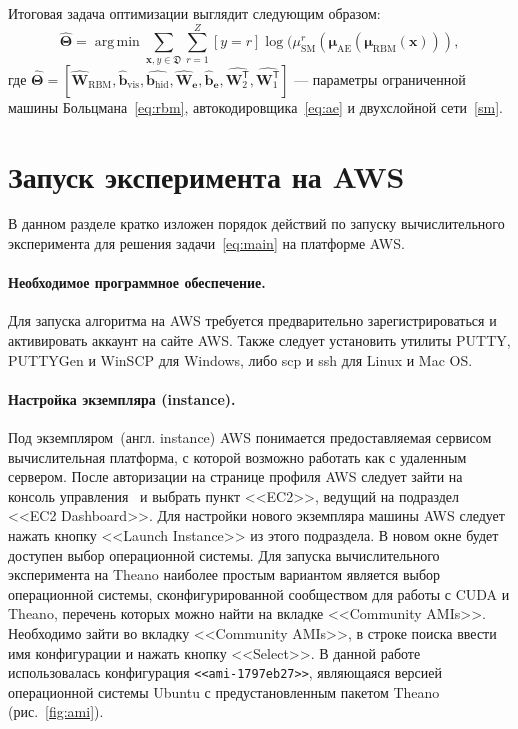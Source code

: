 \documentclass[12pt,notitlepage]{article}
\DeclareMathOperator*{\argmin}{arg\,min}
\begin{document}
Итоговая задача оптимизации выглядит следующим образом:
\[
 \hat{\mathbf{\mathbf{\Theta}}} = \argmin\sum_{\mathbf{x},y \in \mathfrak{D}}\sum_{r = 1}^Z[y = r]\log({\mu}^r_\text{SM}(\mathbf{\boldsymbol{\mu}}_\text{AE}(\mathbf{\boldsymbol{\mu}}_\text{RBM}(\mathbf{x}))),
\]
где $\hat{\mathbf{\mathbf{\Theta}}} = [\hat{\mathbf{W}}_\text{RBM},\hat{\mathbf{b}}_\text{vis},\hat{\mathbf{b}_\text{hid}}, \hat{\mathbf{W}}_\textbf{e}, \hat{\mathbf{b}}_\textbf{e}, \hat{\mathbf{W}^\mathsf{T}_2}, \hat{\mathbf{W}^\mathsf{T}_1}]$ --- параметры ограниченной машины Больцмана~\eqref{eq:rbm}, автокодировщика~\eqref{eq:ae} и двухслойной сети~\eqref{sm}.


\section{Запуск эксперимента на AWS}
В данном разделе кратко изложен порядок действий по запуску вычислительного эксперимента для решения задачи~\eqref{eq:main} на платформе AWS.
\paragraph{Необходимое программное обеспечение.}
Для запуска алгоритма на AWS требуется предварительно зарегистрироваться и активировать аккаунт на сайте AWS. Также следует установить утилиты PUTTY, PUTTYGen и WinSCP для Windows, либо scp и ssh для Linux и Mac OS.
\paragraph{Настройка экземпляра (instance).} Под экземпляром~(англ. instance) AWS понимается предоставляемая сервисом вычислительная платформа, с которой возможно работать как с удаленным сервером. 
После авторизации на странице профиля AWS следует зайти на консоль управления~\cite{console} и выбрать пункт <<EC2>>, ведущий на подраздел <<EC2 Dashboard>>. Для настройки нового экземпляра машины AWS следует нажать кнопку <<Launch Instance>> из этого подраздела. В новом окне будет доступен выбор операционной системы. Для запуска вычислительного эксперимента на Theano наиболее простым вариантом является выбор операционной системы, сконфигурированной сообществом для работы с CUDA и Theano, перечень которых можно найти на вкладке <<Community AMIs>>. Необходимо зайти во вкладку <<Community AMIs>>, в строке поиска ввести имя конфигурации и нажать кнопку <<Select>>.
В данной работе использовалась конфигурация \texttt{<<ami-1797eb27>>}, являющаяся версией операционной системы Ubuntu с предустановленным пакетом Theano (рис.~\ref{fig:ami}).
\end{document}
